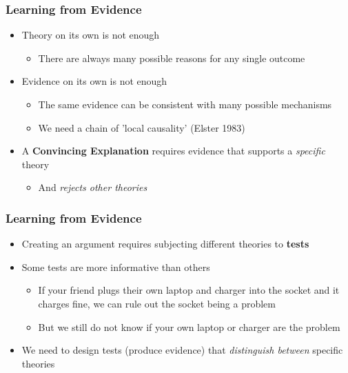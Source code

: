 \documentclass[xcolor=x11names,compress]{beamer}\usepackage[]{graphicx}\usepackage[]{color}
\renewcommand{\(}{\begin{columns}}
\renewcommand{\)}{\end{columns}}
\newcommand{\<}[1]{\begin{column}{#1}}
\renewcommand{\>}{\end{column}}
\begin{document}
\begin{frame}
\frametitle{Learning from Evidence}
\begin{itemize}
\item Theory on its own is not enough
\begin{itemize}
\item There are always many possible reasons for any single outcome
\pause
\end{itemize}
\item Evidence on its own is not enough
\begin{itemize}
\item The same evidence can be consistent with many possible mechanisms
\item We need a chain of 'local causality' (Elster 1983)
\pause
\end{itemize}
\item A \textbf{Convincing Explanation} requires evidence that supports a \textit{specific} theory
\begin{itemize}
\item And \textit{rejects other theories}
\end{itemize}
\end{itemize}
\end{frame}

\begin{frame}
\frametitle{Learning from Evidence}
\begin{itemize}
\item Creating an argument requires subjecting different theories to \textbf{tests}
\pause
\item Some tests are more informative than others
\pause
\begin{itemize}
\item If your friend plugs their own laptop and charger into the socket and it charges fine, we can rule out the socket being a problem
\pause
\item But we still do not know if your own laptop or charger are the problem
\pause
\end{itemize}
\item We need to design tests (produce evidence) that \textit{distinguish between} specific theories
\end{itemize}
\end{frame}
\end{document}
